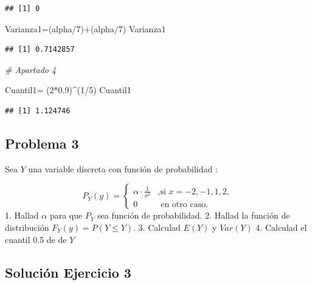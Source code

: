 \documentclass[
]{article}
\newenvironment{Shaded}{\begin{snugshade}}{\end{snugshade}}
\newcommand{\CommentTok}[1]{\textcolor[rgb]{0.56,0.35,0.01}{\textit{#1}}}
\newcommand{\DecValTok}[1]{\textcolor[rgb]{0.00,0.00,0.81}{#1}}
\newcommand{\FloatTok}[1]{\textcolor[rgb]{0.00,0.00,0.81}{#1}}
\newcommand{\NormalTok}[1]{#1}
\newcommand{\OtherTok}[1]{\textcolor[rgb]{0.56,0.35,0.01}{#1}}
\newcommand{\SpecialCharTok}[1]{\textcolor[rgb]{0.00,0.00,0.00}{#1}}
\begin{document}
\begin{verbatim}
## [1] 0
\end{verbatim}

\begin{Shaded}
\begin{Highlighting}[]
\NormalTok{Varianza1}\OtherTok{=}\NormalTok{(alpha}\SpecialCharTok{/}\DecValTok{7}\NormalTok{)}\SpecialCharTok{+}\NormalTok{(alpha}\SpecialCharTok{/}\DecValTok{7}\NormalTok{)}
\NormalTok{Varianza1}
\end{Highlighting}
\end{Shaded}

\begin{verbatim}
## [1] 0.7142857
\end{verbatim}

\begin{Shaded}
\begin{Highlighting}[]
\CommentTok{\# Apartado 4}

\NormalTok{Cuantil1}\OtherTok{=}\NormalTok{ (}\DecValTok{2}\SpecialCharTok{*}\FloatTok{0.9}\NormalTok{)}\SpecialCharTok{\^{}}\NormalTok{(}\DecValTok{1}\SpecialCharTok{/}\DecValTok{5}\NormalTok{)}
\NormalTok{Cuantil1}
\end{Highlighting}
\end{Shaded}

\begin{verbatim}
## [1] 1.124746
\end{verbatim}

\hypertarget{problema-3}{%
\subsection{Problema 3}\label{problema-3}}

Sea \(Y\) una variable discreta con función de probabilidad :

\[
P_Y(y)=
\left\{\begin{array}{ll}
\alpha\cdot\frac{1}{x^2} & \mbox{,si } x=-2,-1,1,2,
 \\
0 & \mbox{ en otro caso}.
\end{array}\right. 
\] 1. Hallad \(\alpha\) para que \(P_Y\) sea función de probabilidad. 2.
Hallad la función de distribución \(F_Y(y)=P(Y\leq Y)\). 3. Calculad
\(E(Y)\) y \(Var(Y)\) 4. Calculad el cuantil 0.5 de de \(Y\)

\hypertarget{soluciuxf3n-ejercicio-3}{%
\subsection{Solución Ejercicio 3}\label{soluciuxf3n-ejercicio-3}}
\end{document}
